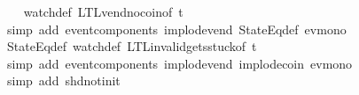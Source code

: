 \begin{isabellebody}
{\ \ \isamarkupfalse%
\ watch{\isacharunderscore}def\ LTL{\isacharunderscore}vend{\isacharunderscore}no{\isacharunderscore}coin{\isacharbrackleft}of\ t{\isacharbrackright}\isanewline
\ \ \ \ \isamarkupfalse%
\ {\isacharparenleft}simp\ add{\isacharcolon}\ event{\isacharunderscore}components\ implode{\isacharunderscore}vend\ StateEq{\isacharunderscore}def\ ev{\isacharunderscore}mono{\isacharparenright}\isanewline
\ \ \isamarkupfalse%
\ StateEq{\isacharunderscore}def\ watch{\isacharunderscore}def\ LTL{\isacharunderscore}invalid{\isacharunderscore}gets{\isacharunderscore}stuck{\isacharunderscore}{}{\isacharbrackleft}of\ t{\isacharbrackright}\isanewline
\ \ \ \isamarkupfalse%
\ {\isacharparenleft}simp\ add{\isacharcolon}\ event{\isacharunderscore}components\ implode{\isacharunderscore}vend\ implode{\isacharunderscore}coin\ ev{\isacharunderscore}mono{\isacharparenright}\isanewline
\ \ \isamarkupfalse%
\ {\isacharparenleft}simp\ add{\isacharcolon}\ shd{\isacharunderscore}not{\isacharunderscore}init{\isacharparenright}%
\endisatagproof
{\isafoldproof}%
%
\isadelimproof
%
\endisadelimproof
%
}%
%
\isadelimtheory
%
\endisadelimtheory
%
\isatagtheory
{}\isamarkupfalse%
%
\endisatagtheory
{\isafoldtheory}%
%
\isadelimtheory
%
\endisadelimtheory
%
\end{isabellebody}%
\endinput
